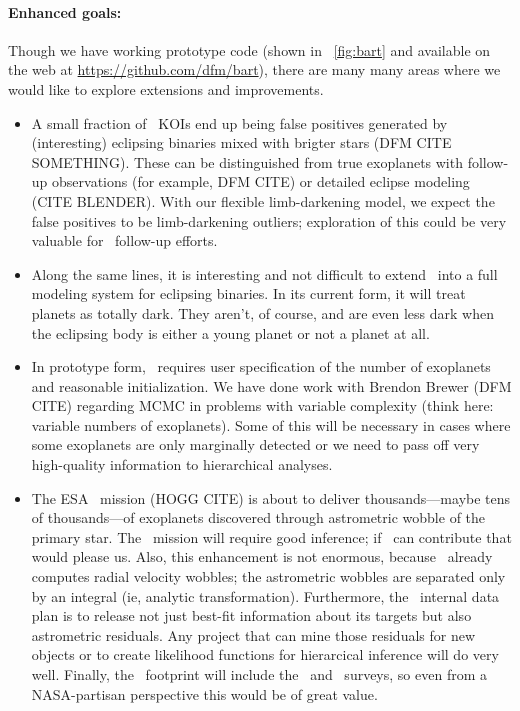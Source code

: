 \documentclass[letterpaper,12pt,preprint]{hack_aastex}
\newcommand{\hurl}[1]{{\scriptsize\url{#1}}}
\newcommand{\Bart}{\package{Bart}}
\begin{document}
\paragraph{Enhanced goals:}
Though we have working prototype code (shown in
\figurename~\ref{fig:bart} and available on the web at
\hurl{https://github.com/dfm/bart}), there are many many areas where we
would like to explore extensions and improvements.
\begin{itemize}
\item
A small fraction of \Kepler\ KOIs end up being false positives
generated by (interesting) eclipsing binaries mixed with brigter stars
(DFM CITE SOMETHING).  These can be distinguished from true exoplanets
with follow-up observations (for example, DFM CITE) or detailed
eclipse modeling (CITE BLENDER).  With our flexible limb-darkening
model, we expect the false positives to be limb-darkening outliers;
exploration of this could be very valuable for \Kepler\ follow-up
efforts.
\item
Along the same lines, it is interesting and not difficult to extend
\Bart\ into a full modeling system for eclipsing binaries.  In its
current form, it will treat planets as totally dark.  They aren't, of
course, and are even less dark when the eclipsing body is either a
young planet or not a planet at all.
\item
In prototype form, \Bart\ requires user specification of the number of
exoplanets and reasonable initialization.  We have done work with
Brendon Brewer (DFM CITE) regarding MCMC in problems with variable
complexity (think here: variable numbers of exoplanets).  Some of this
will be necessary in cases where some exoplanets are only marginally
detected or we need to pass off very high-quality information to
hierarchical analyses.
\item
The ESA \Gaia\ mission (HOGG CITE) is about to deliver
thousands---maybe tens of thousands---of exoplanets discovered through
astrometric wobble of the primary star.  The \Gaia\ mission will
require good inference; if \Bart\ can contribute that would please us.
Also, this enhancement is not enormous, because \Bart\ already
computes radial velocity wobbles; the astrometric wobbles are
separated only by an integral (ie, analytic transformation).
Furthermore, the \Gaia\ internal data plan is to release not just
best-fit information about its targets but also astrometric residuals.
Any project that can mine those residuals for new objects or to create
likelihood functions for hierarcical inference will do very well.
Finally, the \Gaia\ footprint will include the \Kepler\ and
\TESS\ surveys, so even from a NASA-partisan perspective this would be
of great value.
\end{itemize}
\end{document}
